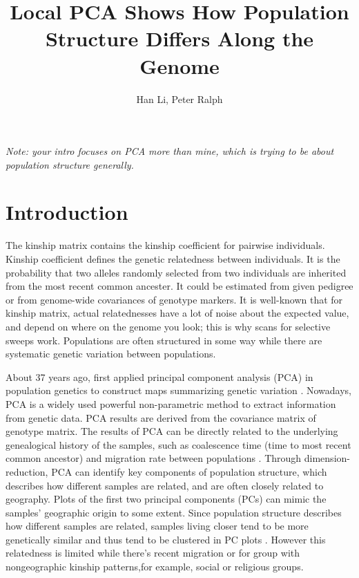 \documentclass[11pt, oneside]{article}   	%
\title{Local PCA Shows How Population Structure Differs Along the Genome}
\author{Han Li, Peter Ralph}
\newcommand{\plr}[1]{{\em \color{blue} #1}}
\begin{document}
\maketitle
\doublespacing

\plr{Note: your intro focuses on PCA more than mine, which is trying to be about population structure generally.}

\section{Introduction}

The kinship matrix contains the kinship coefficient for pairwise individuals. 
Kinship coefficient defines the genetic relatedness between individuals.
It is the probability that two alleles randomly selected from two individuals are inherited from the most recent common ancester.
It could be estimated from given pedigree or from genome-wide covariances of genotype markers. 
It is well-known that for kinship matrix, actual relatednesses have a lot of noise about the expected value, and depend on where on the genome you look; this is why scans for selective sweeps work.
Populations are often structured in some way while there are systematic genetic variation between populations. 

About 37 years ago, \citet{menozzi1978synthetic} first applied principal component analysis (PCA) in population genetics to construct maps summarizing genetic variation \citep{menozzi1978synthetic}. 
Nowadays, PCA is a widely used powerful non-parametric method to extract information from genetic data.  
PCA results are derived from the covariance matrix of genotype matrix. 
The results of PCA can be directly related to the underlying genealogical history of the samples, 
such as coalescence time (time to most recent common ancestor) and migration rate between populations \citep{novembre2008interpreting,mcvean2009genealogical}. 
Through dimension-reduction, PCA can identify key components of population structure, which describes how different samples are related, and are often closely related to geography. 
Plots of the first two principal components (PCs) can mimic the samples' geographic origin to some extent. 
Since population structure describes how different samples are related, samples living closer tend to be more genetically similar and thus tend to be clustered in PC plots \citep{novembre2008genes,patterson2006population}. 
However this relatedness is limited while there's recent migration or for group with nongeographic kinship patterns,for example, social or religious groups. \citep{astle2009population}
\end{document}
